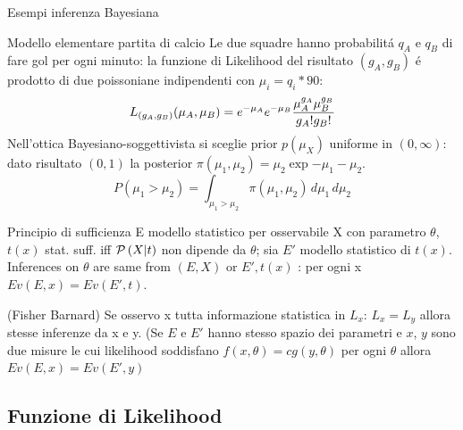 \documentclass[asd-beamer.tex]{subfiles}
\begin{document}
\begin{wordonframe}{Esempi inferenza Bayesiana}
\begin{block}{Modello elementare partita di calcio}
	Le due squadre hanno probabilit\'a $q_A$ e $q_B$ di fare gol per ogni minuto: la funzione di Likelihood del risultato $(g_A,g_B)$ \'e prodotto di due poissoniane indipendenti con $\mu_i=q_i*90$:
	\[L_{(g_A,g_B)}(\mu_A,\mu_B)=e^{-\mu_A}e^{-\mu_B}\frac{\mu_A^{g_A}\mu_B^{g_B}}{g_A!g_B!}\]
	Nell'ottica Bayesiano-soggettivista si sceglie prior $p(\mu_X)$ uniforme in $(0,\infty)$: dato risultato $(0,1)$ la posterior $\pi(\mu_1,\mu_2)=\mu_2\exp{-\mu_1-\mu_2}$.
	\[P(\mu_1>\mu_2)=\int_{\mu_1>\mu_2}\pi(\mu_1,\mu_2)\,d\mu_1\,d\mu_2\]
\end{block}
\end{wordonframe}

\begin{frame}{Principio di sufficienza}
E modello statistico per osservabile X con parametro $\theta$, $t(x)$ stat. suff. iff $\operatorname{\mathcal{P}}{(X|t)}$ non dipende da $\theta$; sia $E'$ modello statistico di $t(x)$. Inferences on $\theta$ are same from $(E,X)$ or $E',t(x)$
	: per ogni x $Ev(E,x)=Ev(E',t)$.
\end{frame}

\begin{frame}{ (Fisher Barnard)}
	Se osservo x tutta informazione statistica in $L_x$: $L_x=L_y$ allora stesse inferenze da x e y. (Se $E$ e $E'$ hanno stesso spazio dei parametri e $x$, $y$ sono due misure le cui likelihood soddisfano $f(x,\theta)=cg(y,\theta)$ per ogni $\theta$ allora $Ev(E,x)=Ev(E',y)$
\end{frame}


\subsection{Funzione di Likelihood}
\end{document}
